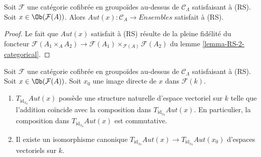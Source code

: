 \begin{lemma}
\label{lemma-Aut-functor-RS}
Soit $\mathcal{F}$ une catégorie cofibrée en groupoïdes au-dessus de
$\mathcal{C}_\Lambda$ satisfaisant à (RS). Soit
$x \in \Ob(\mathcal{F}(A))$. Alors
$\mathit{Aut}(x): \mathcal{C}_A \to \textit{Ensembles}$ satisfait à (RS).
\end{lemma}

\begin{proof}
Le fait que $\mathit{Aut}(x)$ satisfait à (RS) résulte de la pleine fidélité du
foncteur
$\mathcal{F}(A_1 \times_A A_2) \to
\mathcal{F}(A_1) \times_{\mathcal{F}(A)} \mathcal{F}(A_2)$ du lemme
\ref{lemma-RS-2-categorical}.
\end{proof}

\begin{lemma}
\label{lemma-Aut-functor-tangent-space}
Soit $\mathcal{F}$ une catégorie cofibrée en groupoïdes au-dessus de
$\mathcal{C}_\Lambda$ satisfaisant à (RS). Soit
$x \in \Ob(\mathcal{F}(A))$. Soit $x_0$ une image directe de $x$ dans
$\mathcal{F}(k)$.
\begin{enumerate}
\item $T_{\text{id}_{x_0}} \mathit{Aut}(x)$ possède une structure naturelle
d'espace vectoriel sur $k$ telle que l'addition coïncide avec la composition
dans $T_{\text{id}_{x_0}} \mathit{Aut}(x)$. En particulier, la composition
dans $T_{\text{id}_{x_0}} \mathit{Aut}(x)$ est commutative.
\item Il existe un isomorphisme canonique
$T_{\text{id}_{x_0}} \mathit{Aut}(x) \to
T_{\text{id}_{x_0}} \mathit{Aut}(x_0)$
d'espaces vectoriels sur $k$.
\end{enumerate}
\end{lemma}

